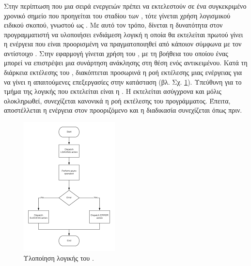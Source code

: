 \subsubsection{}
Στην περίπτωση που μια σειρά ενεργειών πρέπει να εκτελεστούν σε ένα συγκεκριμένο χρονικό σημείο που προηγείται του σταδίου των , τότε γίνεται χρήση λογισμικού ειδικού σκοπού, γνωστού ως . Με αυτό τον τρόπο, δίνεται η δυνατότητα στον προγραμματιστή να υλοποιήσει ενδιάμεση λογική η οποία θα εκτελείται πρωτού γίνει η ενέργεια που είναι προορισμένη να πραγματοποιηθεί από κάποιον  σύμφωνα με τον αντίστοιχο . 
\newline
\indent
Στην εφαρμογή γίνεται χρήση του  \cite{[THUNK]}, με τη βοήθεια του οποίου ένας  μπορεί να επιστρέψει μια συνάρτηση ανάκλησης  στη θέση ενός αντικειμένου. Κατά τη διάρκεια εκτέλεσης του , διακόπτεται προσωρινά η ροή εκτέλεσης μιας ενέργειας για να γίνει η απαιτούμενες επεξεργασίες στην κατάσταση (βλ. Σχ. \ref{thunk}). Υπεύθυνη για το τμήμα της λογικής που εκτελείται είναι η . H  εκτελείται ασύγχρονα και μόλις ολοκληρωθεί, συνεχίζεται κανονικά η ροή εκτέλεσης του προγράμματος. Έπειτα, αποστέλλεται η ενέργεια στον προοριζόμενο  και η διαδικασία συνεχίζεται όπως πριν.

\begin{figure}[H]
    \centering
    \includegraphics[scale=0.8]{figures/redux-thunk.png}
    \caption{Υλοποίηση λογικής του .}
    \label{thunk}
\end{figure}

